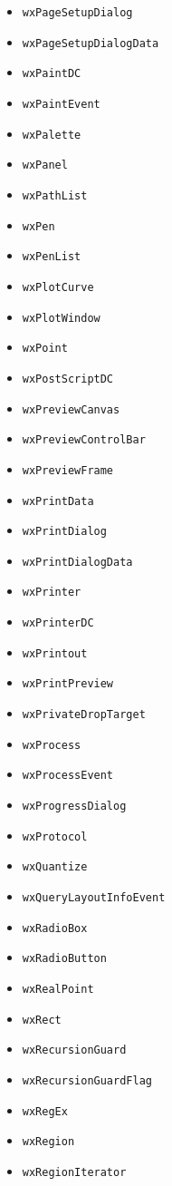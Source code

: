 \documentclass[a4paper,11pt,oneside,titlepage]{report}
\begin{document}
\begin{itemize}
\item \texttt{wxPageSetupDialog}
\item \texttt{wxPageSetupDialogData}
\item \texttt{wxPaintDC}
\item \texttt{wxPaintEvent}
\item \texttt{wxPalette}
\item \texttt{wxPanel}
\item \texttt{wxPathList}
\item \texttt{wxPen}
\item \texttt{wxPenList}
\item \texttt{wxPlotCurve}
\item \texttt{wxPlotWindow}
\item \texttt{wxPoint}
\item \texttt{wxPostScriptDC}
\item \texttt{wxPreviewCanvas}
\item \texttt{wxPreviewControlBar}
\item \texttt{wxPreviewFrame}
\item \texttt{wxPrintData}
\item \texttt{wxPrintDialog}
\item \texttt{wxPrintDialogData}
\item \texttt{wxPrinter}
\item \texttt{wxPrinterDC}
\item \texttt{wxPrintout}
\item \texttt{wxPrintPreview}
\item \texttt{wxPrivateDropTarget}
\item \texttt{wxProcess}
\item \texttt{wxProcessEvent}
\item \texttt{wxProgressDialog}
\item \texttt{wxProtocol}
\item \texttt{wxQuantize}
\item \texttt{wxQueryLayoutInfoEvent}
\item \texttt{wxRadioBox}
\item \texttt{wxRadioButton}
\item \texttt{wxRealPoint}
\item \texttt{wxRect}
\item \texttt{wxRecursionGuard}
\item \texttt{wxRecursionGuardFlag}
\item \texttt{wxRegEx}
\item \texttt{wxRegion}
\item \texttt{wxRegionIterator}

\end{itemize}
\end{document}
